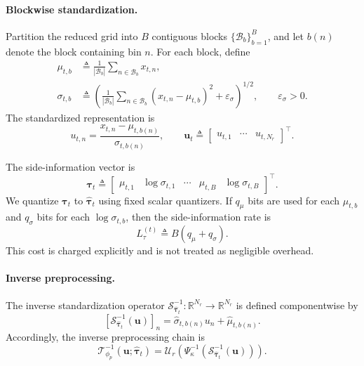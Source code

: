 \documentclass[11pt]{article}
\begin{document}
\paragraph{Blockwise standardization.}
Partition the reduced grid into $B$ contiguous blocks
$\{\mathcal{B}_b\}_{b=1}^{B}$, and let $b(n)$ denote the block containing bin $n$.
For each block, define
\begin{align}
\mu_{t,b}
&\triangleq
\frac{1}{|\mathcal{B}_b|}
\sum_{n \in \mathcal{B}_b} x_{t,n}, \\
\sigma_{t,b}
&\triangleq
\left(
\frac{1}{|\mathcal{B}_b|}
\sum_{n \in \mathcal{B}_b}
(x_{t,n}-\mu_{t,b})^2
+
\varepsilon_{\sigma}
\right)^{1/2},
\qquad
\varepsilon_{\sigma} > 0.
\end{align}
The standardized representation is
\begin{equation}
u_{t,n}
=
\frac{x_{t,n}-\mu_{t,b(n)}}{\sigma_{t,b(n)}},
\qquad
\mathbf{u}_t
\triangleq
\begin{bmatrix}
u_{t,1} & \cdots & u_{t,N_r}
\end{bmatrix}^{\top}.
\end{equation}

The side-information vector is
\begin{equation}
\boldsymbol{\tau}_t
\triangleq
\begin{bmatrix}
\mu_{t,1} &
\log \sigma_{t,1} &
\cdots &
\mu_{t,B} &
\log \sigma_{t,B}
\end{bmatrix}^{\top}.
\end{equation}
We quantize $\boldsymbol{\tau}_t$ to $\hat{\boldsymbol{\tau}}_t$ using fixed scalar quantizers.
If $q_{\mu}$ bits are used for each $\mu_{t,b}$ and $q_{\sigma}$ bits for each $\log \sigma_{t,b}$,
then the side-information rate is
\begin{equation}
L_{\tau}^{(t)} \triangleq B(q_{\mu}+q_{\sigma}).
\end{equation}
This cost is charged explicitly and is not treated as negligible overhead.

\paragraph{Inverse preprocessing.}
The inverse standardization operator
$\mathcal{S}_{\hat{\boldsymbol{\tau}}_t}^{-1} : \mathbb{R}^{N_r} \to \mathbb{R}^{N_r}$
is defined componentwise by
\begin{equation}
\left[
\mathcal{S}_{\hat{\boldsymbol{\tau}}_t}^{-1}(\mathbf{u})
\right]_n
=
\hat{\sigma}_{t,b(n)}u_n + \hat{\mu}_{t,b(n)}.
\end{equation}
Accordingly, the inverse preprocessing chain is
\begin{equation}
\mathcal{T}_{\phi_p}^{-1}(\mathbf{u};\hat{\boldsymbol{\tau}}_t)
=
\mathcal{U}_{r}
\!\left(
\Psi_{\kappa}^{-1}
\!\left(
\mathcal{S}_{\hat{\boldsymbol{\tau}}_t}^{-1}(\mathbf{u})
\right)
\right).
\end{equation}
\end{document}
